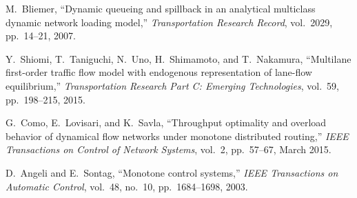 \documentclass[letterpaper, 10 pt, conference]{ieeeconf}
\begin{document}
\begin{thebibliography}{10}
M.~Bliemer, ``Dynamic queueing and spillback in an analytical multiclass
  dynamic network loading model,'' {\em Transportation Research Record},
  vol.~2029, pp.~14--21, 2007.

Y.~Shiomi, T.~Taniguchi, N.~Uno, H.~Shimamoto, and T.~Nakamura, ``Multilane
  first-order traffic flow model with endogenous representation of lane-flow
  equilibrium,'' {\em Transportation Research Part C: Emerging Technologies},
  vol.~59, pp.~198--215, 2015.

G.~Como, E.~Lovisari, and K.~Savla, ``Throughput optimality and overload
  behavior of dynamical flow networks under monotone distributed routing,''
  {\em IEEE Transactions on Control of Network Systems}, vol.~2, pp.~57--67,
  March 2015.

D.~Angeli and E.~Sontag, ``Monotone control systems,'' {\em IEEE Transactions
  on Automatic Control}, vol.~48, no.~10, pp.~1684--1698, 2003.

\end{thebibliography}
 
\end{document}
